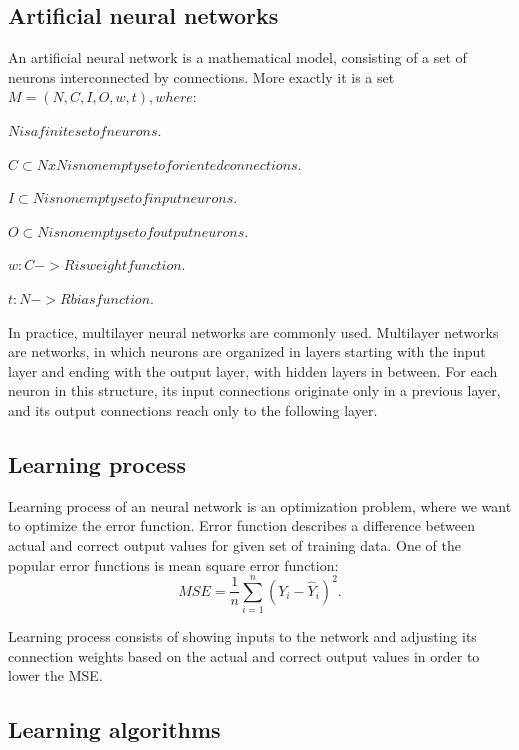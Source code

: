 \subsection{Artificial neural networks}
An artificial neural network is a mathematical model, consisting of a set of neurons interconnected by connections.
More exactly it is a set 
$M  =  (N,C,I,O,w,t),  where: $
\begin{description}
\item $N  is  a  finite  set  of  neurons.$
\item $C \subset N x N  is  nonempty  set  of  oriented  connections.$
\item $I \subset N  is  nonempty  set  of  input  neurons.$
\item $O \subset N  is  nonempty  set  of  output  neurons.$
\item $w : C -> R  is  weight  function.$
\item $t : N->R  bias  function.$
\end{description}

In practice, multilayer neural networks are commonly used. Multilayer networks are networks, in which neurons are organized in layers starting with the input layer and ending with the output layer, with hidden layers in between. For each neuron in this structure, its input connections originate only in a previous layer, and its output connections reach only to the following layer. 

\subsection{Learning process}
Learning process of an neural network is an optimization problem, where we want to optimize the error function. Error function describes a difference between actual and correct output values for given set of training data. One of the popular error functions is mean square error function:
\begin{equation*}
MSE = \frac{1}{n} \sum_{i=1}^{n} (Y_{i} - \hat{Y}_{i})^2.
\end{equation*}

Learning process consists of showing inputs to the network and adjusting its connection weights based on the actual and correct output values in order to lower the MSE.

\subsection{Learning algorithms}

